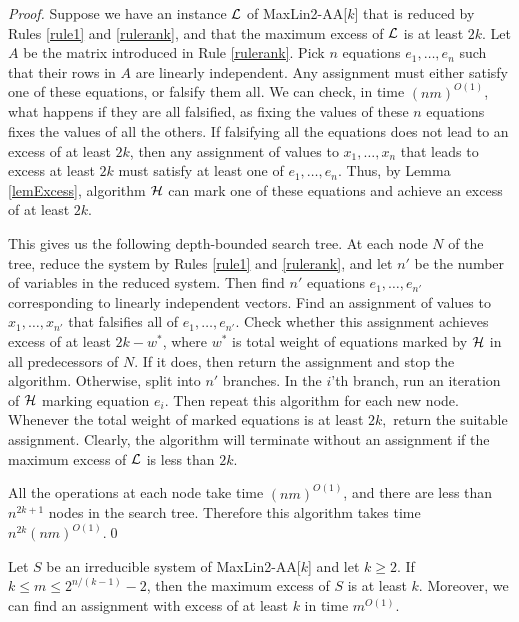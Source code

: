 \documentclass{llncs}
\begin{document}
\begin{proof}
Suppose we have an instance $\cal L$ of {\sc MaxLin2-AA}[$k$] that is reduced by Rules \ref{rule1} and \ref{rulerank},
and that the maximum excess of $\cal L$ is at least $2k$. Let $A$ be the matrix introduced
in Rule \ref{rulerank}.
Pick $n$ equations $e_1,\ldots , e_n$ such that their rows in $A$ are
linearly independent. Any assignment must either satisfy one of these
equations, or falsify them all. We can check, in time $(nm)^{O(1)}$, what
happens if they are all falsified, as fixing the values of these $n$
equations fixes the values of all the others. If falsifying all the
equations does not lead to an excess of at least $2k$, then any assignment
of values to $x_1,\ldots ,x_n$ that leads to excess at least $2k$ must satisfy at least
one of $e_1, \ldots ,e_n$. Thus, by Lemma \ref{lemExcess}, algorithm $\cal
H$ can mark one of these equations and achieve an excess of
at least $2k$.

This gives us the following depth-bounded search tree. At each node $N$ of the
tree, reduce the system by Rules  \ref{rule1} and \ref{rulerank}, and let $n'$ be the number of variables
in the reduced system. Then
find $n'$ equations $e_1,\ldots ,e_{n'}$ corresponding to linearly independent
vectors. Find an assignment of values to $x_1,\ldots ,x_{n'}$ that falsifies all of $e_1,\ldots , e_{n'}$.
Check whether this assignment achieves excess of at least $2k-w^*$, where $w^*$ is total weight of equations marked
by $\cal H$ in all predecessors of $N$. If it does,
then return the assignment and stop the algorithm.
Otherwise, split into $n'$ branches. In the $i$'th branch, run an iteration
of $\cal H$ marking equation $e_i$. Then repeat this algorithm for each
new node. Whenever the total weight of marked equations is at least $2k,$ return the
suitable assignment. Clearly, the algorithm will terminate without an assignment if the maximum excess of
$\cal L$ is less than $2k.$

All the operations at each node take time $(nm)^{O(1)}$, and there are
less than $n^{2k+1}$ nodes in the search tree.
Therefore this algorithm takes time $n^{2k}(nm)^{O(1)}$.\qed
\end{proof}

\begin{theorem}\label{thm:ing2}\cite{CroGutJonKimRuz10}
Let $S$ be an irreducible system of {\sc MaxLin2-AA}[$k$] and let $k\ge 2.$ If $k\le m\le 2^{n/(k-1)}-2$, then the maximum excess of $S$ is at least $k$. Moreover, we can find an assignment with excess of at least $k$ in time $m^{O(1)}$.
\end{theorem}
\end{document}
